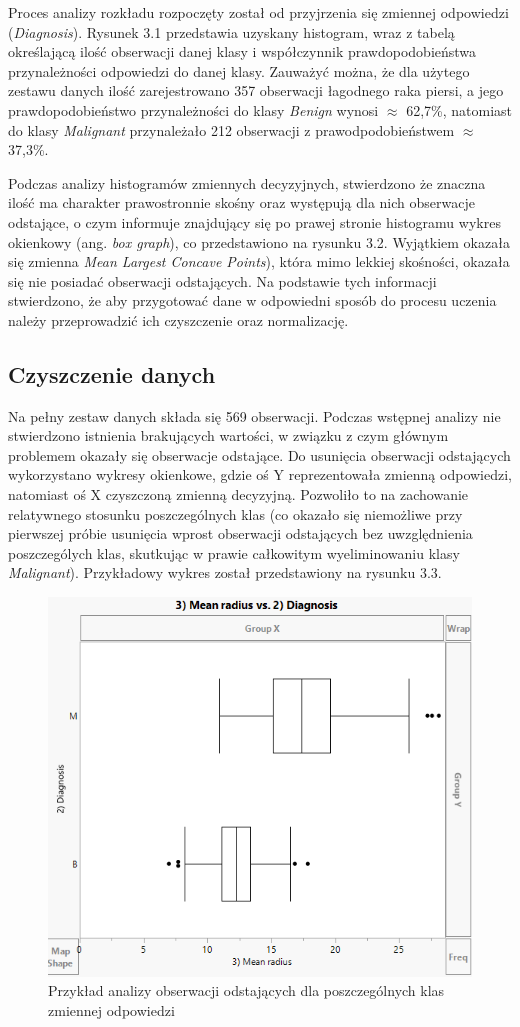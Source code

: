 	
	Proces analizy rozkładu rozpoczęty został od przyjrzenia się zmiennej odpowiedzi (\textit{Diagnosis}). Rysunek 3.1 przedstawia uzyskany histogram, wraz z tabelą określającą ilość obserwacji danej klasy i współczynnik prawdopodobieństwa przynależności odpowiedzi do danej klasy. Zauważyć można, że dla użytego zestawu danych ilość zarejestrowano 357 obserwacji łagodnego raka piersi, a jego prawdopodobieństwo przynależności do klasy \textit{Benign} wynosi $\approx$ 62,7\%, natomiast do klasy \textit{Malignant} przynależało 212 obserwacji z prawodpodobieństwem $\approx$ 37,3\%.
		
	Podczas analizy histogramów zmiennych decyzyjnych, stwierdzono że znaczna ilość ma charakter prawostronnie skośny oraz występują dla nich obserwacje odstające, o czym informuje znajdujący się po prawej stronie histogramu wykres okienkowy (ang. \textit{box graph}), co przedstawiono na rysunku 3.2. Wyjątkiem okazała się zmienna \textit{Mean Largest Concave Points}), która mimo lekkiej skośności, okazała się nie posiadać obserwacji odstających. Na podstawie tych informacji stwierdzono, że aby przygotować dane w odpowiedni sposób do procesu uczenia należy przeprowadzić ich czyszczenie oraz normalizację.
	
	\subsection{Czyszczenie danych}
	
	Na pełny zestaw danych składa się 569 obserwacji. Podczas wstępnej analizy nie stwierdzono istnienia brakujących wartości, w związku z czym głównym problemem okazały się obserwacje odstające. Do usunięcia obserwacji odstających wykorzystano wykresy okienkowe, gdzie oś Y reprezentowała zmienną odpowiedzi, natomiast oś X czyszczoną zmienną decyzyjną. Pozwoliło to na zachowanie relatywnego stosunku poszczególnych klas (co okazało się niemożliwe przy pierwszej próbie usunięcia wprost obserwacji odstających bez uwzględnienia poszczególych klas, skutkując w prawie całkowitym wyeliminowaniu klasy \textit{Malignant}). Przykładowy wykres został przedstawiony na rysunku 3.3.
	
	\begin{figure}[!ht]
		\centering
		\includegraphics[width=0.7\linewidth]{Rysunki/Rozdzial2/box_graph}
		\caption{Przykład analizy obserwacji odstających dla poszczególnych klas zmiennej odpowiedzi}
		\label{fig:boxgraph}
	\end{figure}

